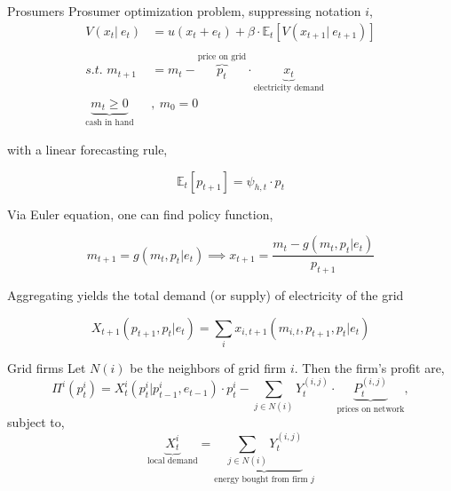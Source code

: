 \documentclass[xcolor={svgnames}]{beamer}
\newcommand{\E}{\mathbb{E}}
\begin{document}
\begin{frame}[allowframebreaks]{Prosumers}
    Prosumer optimization problem, suppressing notation $i$,
    \begin{equation}
        \begin{split}
            V(x_t \vert \ e_t) &= u(x_t + e_t) + \beta \cdot \E_t\left[ V(x_{t+1} \vert \ e_{t + 1} ) \right] \\
            \\
            \textit{s.t. } m_{t+1} &= m_{t} - \overbrace{p_{t}}^{\text{price on grid}} \cdot \underbrace{x_{t}}_{\text{electricity demand}}\\
            \underbrace{m_t  \geq 0}_{\text{cash in hand}}&, \ m_0 = 0
        \end{split}
    \end{equation}

    with a linear forecasting rule,

    \begin{equation}
        \E_t[p_{t+1}] = \psi_{h, t} \cdot p_t
    \end{equation}

    \newpage

    Via Euler equation, one can find policy function,

    \begin{equation}
        m_{t+1} = g(m_t, p_t \vert e_t) \implies x_{t+1} = \frac{m_t - g(m_t, p_t \vert e_t)}{p_{t+1}}
    \end{equation}

    Aggregating yields the total demand (or supply) of electricity of the grid

    \begin{equation}
        X_{t+1}(p_{t+1}, p_t \vert e_t) = \sum_{i} x_{i, t+1}(m_{i, t}, p_{t+1}, p_t \vert e_t)
    \end{equation}

\end{frame}

\begin{frame}{Grid firms}
    Let $N(i)$ be the neighbors of grid firm $i$. Then the firm's profit are,
    \begin{equation}
        \Pi^i(p^i_t) = X^i_{t}(p^i_t\vert p^i_{t-1}, e_{t-1}) \cdot p^i_t - \sum_{j \in N(i)} Y^{(i, j)}_{t} \cdot \underbrace{P^{(i, j)}_t}_{\text{prices on network}},
    \end{equation}
    subject to,
    \begin{equation}
        \underbrace{X^i_t}_{\text{local demand}} =  \underbrace{\sum_{j \in N(i)} Y^{(i, j)}_{t}}_{\text{energy bought from firm $j$}}
    \end{equation}
\end{frame}
\end{document}
